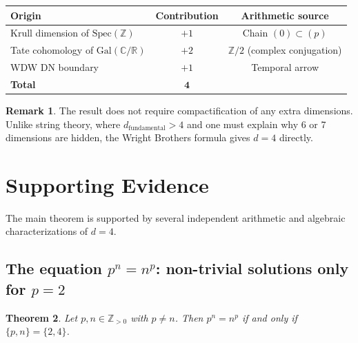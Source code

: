 \documentclass[12pt,a4paper]{article}
\newtheorem{theorem}{Theorem}[section]
\theoremstyle{definition}
\newtheorem{remark}[theorem]{Remark}
\newcommand{\Spec}{\mathrm{Spec}}
\newcommand{\Gal}{\mathrm{Gal}}
\newcommand{\ZZ}{\mathbb{Z}}
\newcommand{\RR}{\mathbb{R}}
\newcommand{\CC}{\mathbb{C}}
\begin{document}
\begin{center}
\begin{tabular}{lcc}
\toprule
\textbf{Origin} & \textbf{Contribution} & \textbf{Arithmetic source} \\
\midrule
Krull dimension of $\Spec(\ZZ)$ & $+1$ & Chain $(0) \subset (p)$ \\
Tate cohomology of $\Gal(\CC/\RR)$ & $+2$ & $\ZZ/2$ (complex conjugation) \\
WDW DN boundary & $+1$ & Temporal arrow \\
\midrule
\textbf{Total} & $\mathbf{4}$ & \\
\bottomrule
\end{tabular}
\end{center}

\begin{remark}
The result does not require compactification of any extra dimensions. Unlike string
theory, where $d_{\text{fundamental}} > 4$ and one must explain why 6 or 7 dimensions
are hidden, the Wright Brothers formula gives $d=4$ directly.
\end{remark}

\section{Supporting Evidence}\label{sec:supporting}

The main theorem is supported by several independent arithmetic and algebraic
characterizations of $d=4$.

\subsection{The equation $p^n = n^p$: non-trivial solutions only for $p=2$}

\begin{theorem}\label{thm:pn_np}
Let $p, n \in \ZZ_{>0}$ with $p \neq n$. Then $p^n = n^p$ if and only if
$\{p, n\} = \{2, 4\}$.
\end{theorem}
\end{document}
